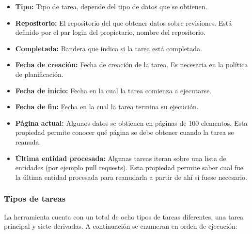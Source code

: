 \begin{itemize}
\tightlist
	\item \textbf{Tipo:} Tipo de tarea, depende del tipo de datos que se obtienen.
	\item \textbf{Repositorio:} El repositorio del que obtener datos sobre revisiones. Está definido por el par login del propietario, nombre del repositorio.
	\item \textbf{Completada:} Bandera que indica si la tarea está completada.
	\item \textbf{Fecha de creación:} Fecha de creación de la tarea. Es necesaria en la política de planificación.
	\item \textbf{Fecha de inicio:} Fecha en la cual la tarea comienza a ejecutarse.
	\item \textbf{Fecha de fin:} Fecha en la cual la tarea termina su ejecución.
	\item \textbf{Página actual:} Algunos datos se obtienen en páginas de 100 elementos. Esta propiedad permite conocer qué página se debe obtener cuando la tarea se reanuda.
	\item \textbf{Última entidad procesada:} Algunas tareas iteran sobre una lista de entidades (por ejemplo pull requests). Esta propiedad permite saber cual fue la última entidad procesada para reanudarla a partir de ahí si fuese necesario.
\end{itemize}

\subsubsection{Tipos de tareas}

La herramienta cuenta con un total de ocho tipos de tareas diferentes, una tarea principal y siete derivadas. A continuación se enumeran en orden de ejecución:

